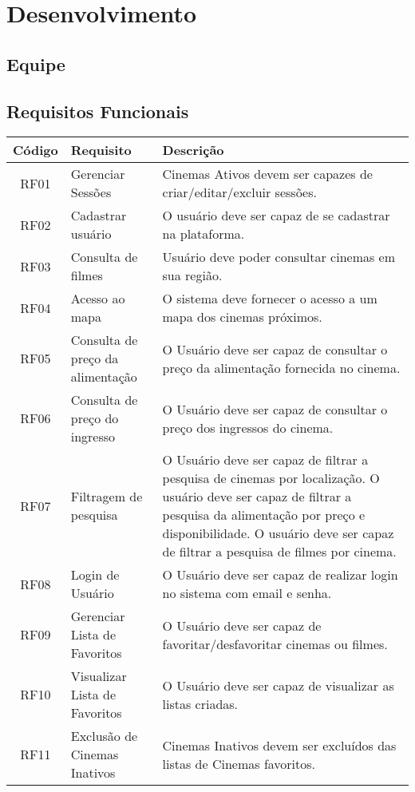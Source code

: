 \documentclass[
	article,			%
	12pt,				%
	oneside,			%
	a4paper,			%
	english,			%
	brazil,				%
	sumario=tradicional
	]{abntex2}
\begin{document}
\section{Desenvolvimento}

\subsection{Equipe}
\lipsum[1]

\subsection{Requisitos Funcionais}

\begin{tabular}{|c|l|p{6cm}|}
\hline
\textbf{Código} & \textbf{Requisito} & \textbf{Descrição} \\
\hline
RF01 & Gerenciar Sessões & Cinemas Ativos devem ser capazes de criar/editar/excluir sessões. \\
\hline
RF02 & Cadastrar usuário & O usuário deve ser capaz de se cadastrar na plataforma. \\
\hline
RF03 & Consulta de filmes & Usuário deve poder consultar cinemas em sua região. \\
\hline
RF04 & Acesso ao mapa & O sistema deve fornecer o acesso a um mapa dos cinemas próximos. \\
\hline
RF05 & Consulta de preço da alimentação & O Usuário deve ser capaz de consultar o preço da alimentação fornecida no cinema. \\
\hline
RF06 & Consulta de preço do ingresso & O Usuário deve ser capaz de consultar o preço dos ingressos do cinema. \\
\hline
RF07 & Filtragem de pesquisa & O Usuário deve ser capaz de filtrar a pesquisa de cinemas por localização. O usuário deve ser capaz de filtrar a pesquisa da alimentação por preço e disponibilidade. O usuário deve ser capaz de filtrar a pesquisa de filmes por cinema. \\
\hline
RF08 & Login de Usuário & O Usuário deve ser capaz de realizar login no sistema com email e senha. \\
\hline
RF09 & Gerenciar Lista de Favoritos & O Usuário deve ser capaz de favoritar/desfavoritar cinemas ou filmes. \\
\hline
RF10 & Visualizar Lista de Favoritos & O Usuário deve ser capaz de visualizar as listas criadas. \\
\hline
RF11 & Exclusão de Cinemas Inativos & Cinemas Inativos devem ser excluídos das listas de Cinemas favoritos. \\
\hline

\hline
\hline
\end{tabular}
\end{document}
